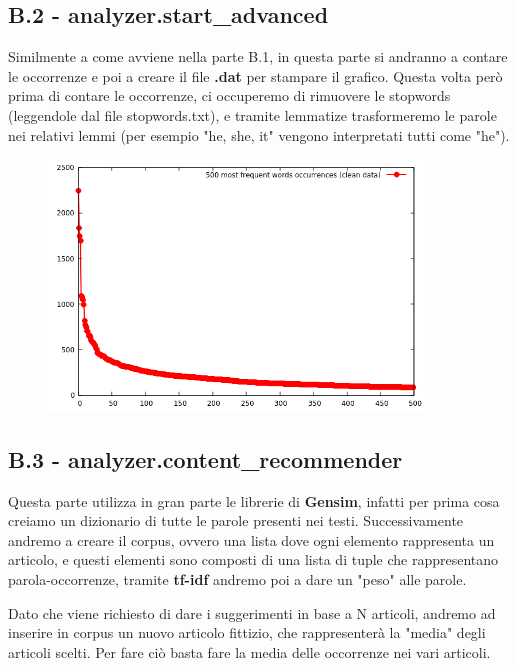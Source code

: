 \documentclass{article}
\begin{document}
\subsection{B.2 - analyzer.start\_advanced}
Similmente a come avviene nella parte B.1, in questa parte si andranno a contare le occorrenze e poi a creare il file \textbf{.dat} per stampare il grafico.
Questa volta però prima di contare le occorrenze, ci occuperemo di rimuovere le stopwords (leggendole dal file stopwords.txt), e tramite lemmatize trasformeremo le parole nei relativi lemmi (per esempio "he, she, it" vengono interpretati tutti come "he").
\begin{figure}[h]
	\includegraphics[width=10cm]{plotted_clean.png}
	\centering
\end{figure}
\newpage
\subsection{B.3 - analyzer.content\_recommender}
Questa parte utilizza in gran parte le librerie di \textbf{Gensim}, infatti per prima cosa creiamo un dizionario di tutte le parole presenti nei testi. Successivamente andremo a creare il corpus, ovvero una lista dove ogni elemento rappresenta un articolo, e questi elementi sono composti di una lista di tuple che rappresentano parola-occorrenze, tramite \textbf{tf-idf} andremo poi a dare un "peso" alle parole.

Dato che viene richiesto di dare i suggerimenti in base a N articoli, andremo ad inserire in corpus un nuovo articolo fittizio, che rappresenterà la "media" degli articoli scelti. Per fare ciò basta fare la media delle occorrenze nei vari articoli.
\end{document}
